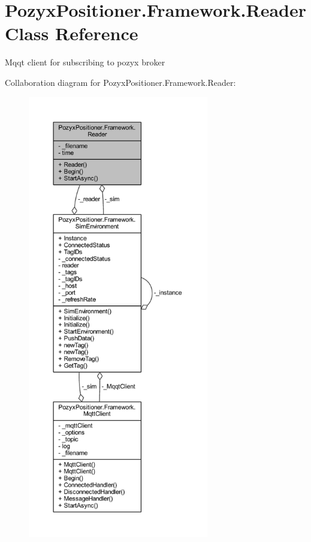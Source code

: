 \hypertarget{class_pozyx_positioner_1_1_framework_1_1_reader}{}\section{Pozyx\+Positioner.\+Framework.\+Reader Class Reference}
\label{class_pozyx_positioner_1_1_framework_1_1_reader}


Mqqt client for subscribing to pozyx broker  




Collaboration diagram for Pozyx\+Positioner.\+Framework.\+Reader\+:
\nopagebreak
\begin{figure}[H]
\begin{center}
\leavevmode
\includegraphics[height=550pt]{class_pozyx_positioner_1_1_framework_1_1_reader__coll__graph}
\end{center}
\end{figure}
